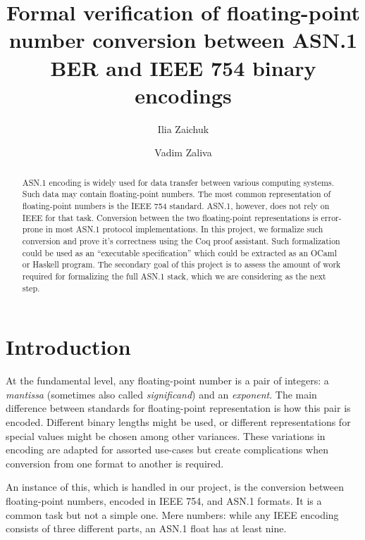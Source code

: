 \documentclass[sigplan]{acmart}
\begin{document}
\title{Formal verification of floating-point number conversion between ASN.1 BER and IEEE 754 binary encodings}

\author{Ilia Zaichuk}

\author{Vadim Zaliva}

\begin{abstract}

ASN.1 encoding is widely used for data transfer between various computing systems.
Such data may contain floating-point numbers. The most common representation of
floating-point numbers is the IEEE 754 standard. ASN.1, however, does not rely
on IEEE for that task. Conversion between the two floating-point
representations is error-prone in most ASN.1 protocol implementations. In this
project, we formalize such conversion and prove it's correctness using the Coq
proof assistant. Such formalization could be used as an ``executable specification'' which
could be extracted as an OCaml or Haskell program. The secondary goal of this project is
to assess the amount of work required for formalizing the full ASN.1 stack, which
we are considering as the next step.

\end{abstract}


\maketitle



\section{Introduction}

At the fundamental level, any floating-point number is a pair of integers: a \textit{mantissa}
(sometimes also called \textit{significand}) and an \textit{exponent}. The main difference between
standards for floating-point representation is how this pair is encoded. Different binary lengths
might be used, or different representations for special values might be chosen among other variances. These variations in encoding
are adapted for assorted use-cases but create complications when conversion from one format to another
is required.

An instance of this, which is handled in our project, is the conversion between floating-point numbers,
encoded in IEEE 754, and ASN.1 formats. It is a common task but not a simple one.
Mere numbers: while any IEEE encoding consists of three different parts, an ASN.1 float has at least nine.
\end{document}
